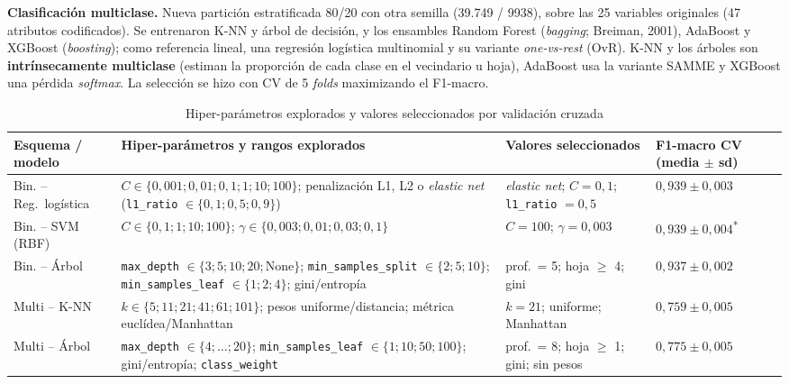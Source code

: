 \documentclass[titlepage,a4paper]{article}
\newcommand{\code}[1]{\texttt{#1}}
\begin{document}
\textbf{Clasificación multiclase.} Nueva partición estratificada 80/20 con otra semilla (39.749 / 9938), sobre las 25 variables originales (47 atributos codificados). Se entrenaron K-NN y árbol de decisión, y los ensambles Random Forest (\textit{bagging}; Breiman, 2001), AdaBoost y XGBoost (\textit{boosting}); como referencia lineal, una regresión logística multinomial y su variante \textit{one-vs-rest} (OvR). K-NN y los árboles son \textbf{intrínsecamente multiclase} (estiman la proporción de cada clase en el vecindario u hoja), AdaBoost usa la variante SAMME y XGBoost una pérdida \textit{softmax}. La selección se hizo con CV de 5 \textit{folds} maximizando el F1-macro.

\begin{table}[!htbp]
\centering
\caption{Hiper-parámetros explorados y valores seleccionados por validación cruzada}
\label{tab:hiperparametros}
\footnotesize
\renewcommand{\arraystretch}{1.12}
\begin{tabularx}{\textwidth}{@{}>{\raggedright\arraybackslash}p{2.6cm} >{\raggedright\arraybackslash}X >{\raggedright\arraybackslash}p{3.3cm} >{\centering\arraybackslash}p{2.3cm}@{}}
\toprule
\textbf{Esquema / modelo} & \textbf{Hiper-parámetros y rangos explorados} & \textbf{Valores seleccionados} & \textbf{F1-macro CV (media $\pm$ sd)} \\
\midrule
Bin. -- Reg.\ logística & $C \in \{0{,}001; 0{,}01; 0{,}1; 1; 10; 100\}$; penalización L1, L2 o \textit{elastic net} (\code{l1\_ratio} $\in \{0{,}1; 0{,}5; 0{,}9\}$) & \textit{elastic net}; $C = 0{,}1$; \code{l1\_ratio} $= 0{,}5$ & $0{,}939 \pm 0{,}003$ \\
Bin. -- SVM (RBF) & $C \in \{0{,}1; 1; 10; 100\}$; $\gamma \in \{0{,}003; 0{,}01; 0{,}03; 0{,}1\}$ & $C = 100$; $\gamma = 0{,}003$ & $0{,}939 \pm 0{,}004$\textsuperscript{*} \\
Bin. -- Árbol & \code{max\_depth} $\in \{3; 5; 10; 20; \text{None}\}$; \code{min\_samples\_split} $\in \{2; 5; 10\}$; \code{min\_samples\_leaf} $\in \{1; 2; 4\}$; gini/entropía & prof.\ = 5; hoja $\geq$ 4; gini & $0{,}937 \pm 0{,}002$ \\
\midrule
Multi -- K-NN & $k \in \{5; 11; 21; 41; 61; 101\}$; pesos uniforme/distancia; métrica euclídea/Manhattan & $k = 21$; uniforme; Manhattan & $0{,}759 \pm 0{,}005$ \\
Multi -- Árbol & \code{max\_depth} $\in \{4;\dots;20\}$; \code{min\_samples\_leaf} $\in \{1; 10; 50; 100\}$; gini/entropía; \code{class\_weight} & prof.\ = 8; hoja $\geq$ 1; gini; sin pesos & $0{,}775 \pm 0{,}005$ \\

\end{tabularx}
\end{table}
\end{document}
